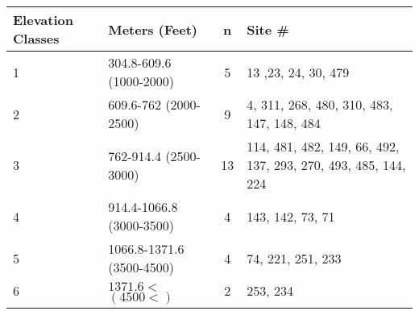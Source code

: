 \begin{table}[h]\footnotesize
\begin{tabular}{p{1.5cm}p{2cm}cp{4.4cm}}
\toprule
Elevation Classes & Meters (Feet)                           & n & Site \# \\ 
\midrule

1                        & 304.8-609.6 (1000-2000)           & 5   & 13 ,23, 24, 30, 479 \\ 
2                        & 609.6-762 (2000-2500)              & 9   & 4, 311, 268, 480, 310, 483, 147, 148, 484 \\ 
3                        & 762-914.4 (2500-3000)              & 13 & 114, 481, 482, 149, 66, 492, 137, 293, 270, 493, 485, 144, 224 \\ 
4                        & 914.4-1066.8 (3000-3500)         & 4   & 143, 142, 73, 71 \\ 
5                        & 1066.8-1371.6 (3500-4500)       & 4   & 74, 221, 251, 233 \\ 
6                        &                     & 2   & 253, 234 \\ 
&&&\\
\bottomrule
\end{tabular}
\end{table}